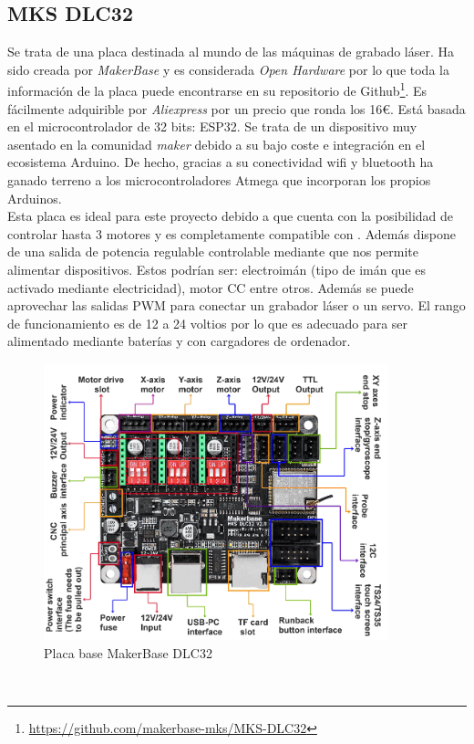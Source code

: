 \subsection{MKS DLC32}
\label{subsec:mksdlc32}
Se trata de una placa destinada al mundo de las máquinas de grabado láser. Ha sido creada por \textit{MakerBase} y es considerada 
\textit{Open Hardware} por lo que toda la información de la placa puede encontrarse en su repositorio de Github\footnote{\url{https://github.com/makerbase-mks/MKS-DLC32}}.
Es fácilmente adquirible por \textit{Aliexpress} por un precio que ronda los 16\euro. Está basada en el microcontrolador de 32 bits: ESP32. 
Se trata de un dispositivo muy asentado en la comunidad \textit{maker} debido a su bajo coste e integración en el 
ecosistema Arduino. De hecho, gracias a su conectividad wifi y bluetooth ha ganado terreno a los microcontroladores Atmega que incorporan los propios Arduinos.\\
Esta placa es ideal para este proyecto debido a que cuenta con la posibilidad de controlar 
hasta 3 motores y es completamente compatible con . Además dispone de una salida de potencia regulable controlable mediante  que nos 
permite alimentar dispositivos. Estos podrían ser: electroimán (tipo de imán que es activado mediante electricidad), motor \ac{CC} entre otros. Además se puede aprovechar las salidas \ac{PWM} para conectar un grabador láser o un servo. 
El rango de funcionamiento es de 12 a 24 voltios por lo que es adecuado para ser alimentado mediante baterías y con cargadores de ordenador. 
\begin{figure} [h!]
    \begin{center}
      \includegraphics[width=10cm]{figs/MKS.png}
    \end{center}
    \caption{Placa base MakerBase DLC32}
    \label{fig:robSoldering}
  \end{figure}\ 

